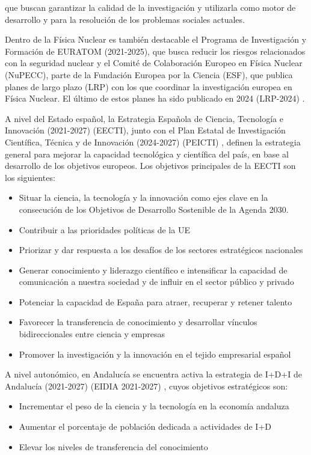 \documentclass[a4paper,12pt,twoside]{article}
\begin{document}
que buscan garantizar la calidad de la investigación y utilizarla como motor de desarrollo y para la resolución de los problemas sociales actuales.

Dentro de la Física Nuclear es también destacable el Programa de Investigación y Formación de
EURATOM (2021-2025), que busca reducir los riesgos relacionados con la seguridad nuclear y el Comité de Colaboración Europeo en Física Nuclear (NuPECC), parte de la Fundación Europea por la Ciencia (ESF), que publica planes de largo plazo (LRP) con los que coordinar la investigación europea en Física Nuclear. El último de estos planes ha sido publicado en 2024  (LRP-2024) \cite{nupecc}.

A nivel del Estado español, la Estrategia Española de Ciencia, Tecnología e Innovación (2021-2027) (EECTI)\cite{eecti}, junto con el Plan Estatal de Investigación
Científica, Técnica y de Innovación (2024-2027) (PEICTI) \cite{peicti}, definen la estrategia general para mejorar la capacidad tecnológica y científica del país, en base al desarrollo de los objetivos europeos. Los objetivos principales de la EECTI son los siguientes:

\begin{itemize}
\item Situar la ciencia, la tecnología y la innovación como ejes clave en la consecución de los Objetivos de Desarrollo Sostenible de la Agenda 2030.
\item Contribuir a las prioridades políticas de la UE
\item Priorizar y dar respuesta a los desafíos de los sectores estratégicos nacionales
\item Generar conocimiento y liderazgo científico e intensificar la capacidad de comunicación a nuestra sociedad y de influir en el sector público y privado
\item Potenciar la capacidad de España para atraer, recuperar y retener talento
\item Favorecer la transferencia de conocimiento y desarrollar vínculos bidireccionales entre
ciencia y empresas
\item Promover la investigación y la innovación en el tejido empresarial español
\end{itemize}

A nivel autonómico, en Andalucía se encuentra activa la estrategia de I+D+I de Andalucía (2021-2027) (EIDIA 2021-2027) \cite{eidia}, cuyos objetivos estratégicos son:

\begin{itemize}
\item Incrementar el peso de la ciencia y la tecnología en la economía andaluza
\item Aumentar el porcentaje de población dedicada a actividades de I+D
\item Elevar los niveles de transferencia del conocimiento
\end{itemize}
\end{document}
